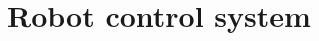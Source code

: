 \documentclass[conference,compsoc]{IEEEtran}
\begin{document}


\section{Robot control system}
\label{sec:robotControl}

\end{document}
